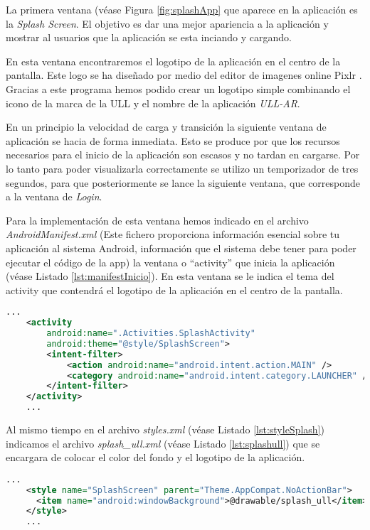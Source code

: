 La primera ventana (véase Figura \ref{fig:splashApp} que aparece en la aplicación es la \textit{Splash Screen}. El objetivo es dar una mejor apariencia a la aplicación y mostrar al usuarios que la aplicación se esta inciando y cargando. 

En esta ventana encontraremos el logotipo de la aplicación en el centro de la pantalla. Este logo se ha diseñado por medio del editor de imagenes online Pixlr \cite{URL::pixlr}. Gracias a este programa hemos podido crear un logotipo simple combinando el icono de la marca de la ULL y el nombre de la aplicación \textit{ULL-AR}.

En un principio la velocidad de carga y transición la siguiente ventana de aplicación se hacia de forma inmediata. Esto se produce por que los recursos necesarios para el inicio de la aplicación son escasos y no tardan en cargarse. Por lo tanto para poder visualizarla correctamente se utilizo un temporizador de tres segundos, para que posteriormente se lance la siguiente ventana, que corresponde a la ventana de \textit{Login}.

Para la implementación de esta ventana hemos indicado en el archivo \textit{AndroidManifest.xml} (Este fichero proporciona información esencial sobre tu aplicación al sistema Android, información que el sistema debe tener para poder ejecutar el código de la app) la ventana o ``activity'' \cite{URL::activity} que inicia la aplicación (véase Listado \ref{lst:manifestInicio}). En esta ventana se le indica el tema del activity que contendrá el logotipo de la aplicación en el centro de la pantalla.

\begin{lstlisting}[language=XML,caption={Fichero \textit{AndroidManifest.xml}, activity que inicia la aplicación.}, label={lst:manifestInicio}]
    ...
    <activity
        android:name=".Activities.SplashActivity"
        android:theme="@style/SplashScreen">
        <intent-filter> 
            <action android:name="android.intent.action.MAIN" />
            <category android:name="android.intent.category.LAUNCHER" />
        </intent-filter>
    </activity>
    ...
\end{lstlisting}

Al mismo tiempo en el archivo \textit{styles.xml} (véase Listado \ref{lst:styleSplash}) indicamos el archivo \textit{splash\_ull.xml} (véase Listado \ref{lst:splashull}) que se encargara de colocar el color del fondo y el logotipo de la aplicación. 

\begin{lstlisting}[language=XML,caption={Fichero \textit{styles.xml}, estilo de la \textit{Splash Screen}.}, label={lst:styleSplash}]
    ...
    <style name="SplashScreen" parent="Theme.AppCompat.NoActionBar">
      <item name="android:windowBackground">@drawable/splash_ull</item>
    </style>
    ...
\end{lstlisting}

